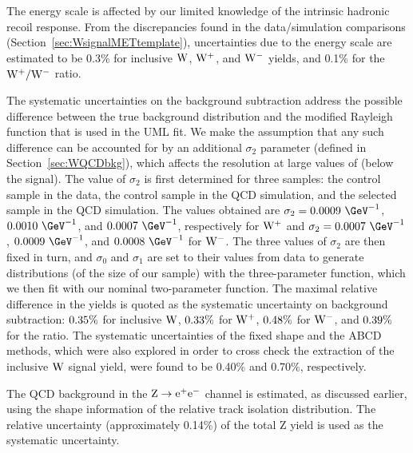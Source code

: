 The \MET energy scale is affected by our limited knowledge of the intrinsic hadronic
recoil response. From the discrepancies found in the data/simulation
comparisons (Section~\ref{sec:WsignalMETtemplate}), uncertainties due to
the \MET energy scale are estimated to be 0.3\% for inclusive $\mathrm{W}$,
$\mathrm{W^+}$, and $\mathrm{W^-}$ yields, and 0.1\% for the $\mathrm{W^+}/\mathrm{W^-}$ ratio.

\par
The systematic uncertainties on the background subtraction
address the possible difference between the true background distribution
and the modified Rayleigh function that is used in the UML fit.
We make the assumption that any such difference can be accounted
for by an additional $\sigma_2$ parameter (defined in Section~\ref{sec:WQCDbkg}),
which affects the resolution at large values of \MET (below the signal).
The value of $\sigma_2$ is first determined for three samples: the control sample
in the data, the control sample in the QCD simulation, and the
selected sample in the QCD simulation. The values obtained are $\sigma_2=0.0009~\GeV^{-1}$,
$0.0010~\GeV^{-1}$, and $0.0007~\GeV^{-1}$, respectively for $\mathrm{W^+}$ and
$\sigma_2=0.0007~\GeV^{-1}$,
$0.0009~\GeV^{-1}$, and $0.0008~\GeV^{-1}$ for $\mathrm{W^-}$.
The three values of $\sigma_2$ are then fixed in turn, and $\sigma_0$ and $\sigma_1$
are set to their values from data to generate distributions (of the size
of our sample) with
the three-parameter function, which  we then fit with our nominal two-parameter
function. The maximal relative difference in the yields
is quoted as the systematic uncertainty on background subtraction: $ 0.35  \%$ for inclusive $\mathrm{W}$,
$ 0.33  \%$ for $\mathrm{W^+}$, $ 0.48  \%$ for $\mathrm{W^-}$, and $ 0.39  \%$ for the ratio.
%
%
The systematic uncertainties of the fixed shape and the ABCD methods, which were also explored 
in order to cross check the extraction of the inclusive $\mathrm{W}$ signal yield, were found to 
be 0.40$\%$ and 0.70$\%$, respectively. 

%
%
%
%
%

The QCD background in the $\mathrm{Z} \rightarrow \mathrm{e}^+\mathrm{e}^-$ channel is estimated, as discussed earlier, 
using the shape information of the relative track isolation distribution. 
The relative uncertainty (approximately 0.14$\%$) of the 
total Z yield is used as the systematic uncertainty. 

